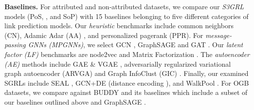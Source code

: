 \documentclass[sigconf, nonacm]{acmart}
\newcommand{\posplus}{\xspace}
\newcommand{\pos}{{P\lowercase{o}S}\xspace}
\newcommand{\sop}{{S\lowercase{o}P}\xspace}
\newcommand{\ssgrl}{\textit{S3GRL}\xspace}
\begin{document}
\vskip 1mm
\noindent \textbf{Baselines.} For attributed and non-attributed datasets, we compare our \ssgrl models (\pos, \posplus, and \sop) with 15 baselines belonging to five different categories of link prediction models. Our \textit{heuristic} benchmarks include common neighbors (CN), Adamic Adar (AA) \cite{adamic2003friends}, and personalized pagerank (PPR). For \textit{message-passing GNNs (MPGNNs)}, we select GCN \cite{kipf2017semi}, GraphSAGE \cite{hamilton2017inductive} and GAT \cite{vaswani2017attention}. Our \textit{latent factor (LF)} benchmarks are  node2vec \cite{grover2016node2vec} and Matrix Factorization \cite{koren2009matrix}. The \textit{autoencoder (AE)} methods include GAE \& VGAE \cite{kipf2016variational}, adversarially regularized variational graph autoencoder  (ARVGA) \cite{pan2018adversarially} and Graph InfoClust (GIC) \cite{Mavromatis2021GraphIM}. Finally, our examined SGRLs include SEAL \cite{zhang2018link}, GCN+DE (distance encoding
\cite{li2020distance}), and WalkPool \cite{pan2022neural}.  For OGB datasets, we compare against BUDDY \cite{chamberlain2023graph} and its baselines which include a subset of our baselines outlined above and GraphSAGE \cite{hamilton2017inductive}. 
\end{document}

